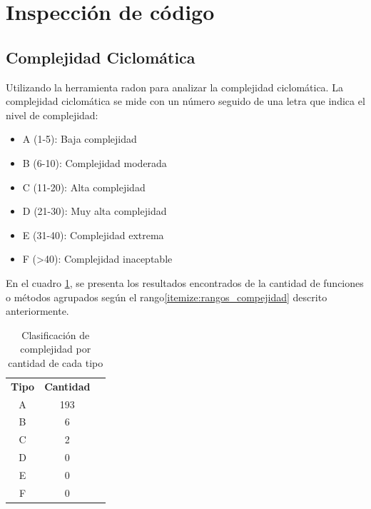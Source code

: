 \documentclass[10pt,times,twocolumn]{article}
\begin{document}
\section{Inspección de código}
\subsection{Complejidad Ciclomática}
	Utilizando la herramienta radon \cite{radon} para analizar la complejidad ciclomática. La complejidad ciclomática se mide con un número seguido de una letra que indica el nivel de complejidad:
	\begin{itemize}
		\item A (1-5): Baja complejidad
		\item B (6-10): Complejidad moderada
		\item C (11-20): Alta complejidad
		\item D (21-30): Muy alta complejidad
		\item E (31-40): Complejidad extrema
		\item F (\textgreater40): Complejidad inaceptable
		\label{itemize:rangos_compejidad}	
	\end{itemize}
	
	En el cuadro \ref{tab:tipos_complejidad}, se presenta los resultados encontrados de la cantidad de funciones o métodos agrupados según el rango\ref{itemize:rangos_compejidad} descrito anteriormente.
	
	\begin{table}[ht]
	    \begin{tabular}{ccc}
	    	\rowcolor{gray!15}
	        \textbf{Tipo} & \textbf{Cantidad} \\
	        A & 193 \\
	        B & 6 \\
	        C & 2 \\
	        D & 0 \\
	        E & 0 \\
	        F & 0 \\
	    \end{tabular}
	    \centering
	    \caption{Clasificación de complejidad por cantidad de cada tipo}
	    \label{tab:tipos_complejidad}
	\end{table}
\end{document}

